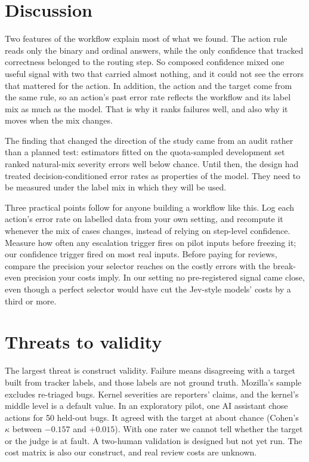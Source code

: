 \section{Discussion}
\label{sec:discussion}

Two features of the workflow explain most of what we found. The action
rule reads only the binary and ordinal answers, while the only confidence
that tracked correctness belonged to the routing step. So composed confidence mixed one useful signal with two that carried
almost nothing, and it could not see the errors that mattered for the
action. In addition, the action and the target come from the same rule,
so an action's past error rate reflects the workflow and its label mix
as much as the model. That is why it ranks failures well, and also why
it moves when the mix changes.

The finding that changed the direction of the study came from an audit
rather than a planned test: estimators fitted on the quota-sampled
development set ranked natural-mix severity errors well below chance.
Until then, the design had treated decision-conditioned error rates as
properties of the model. They need to be measured under the label mix in
which they will be used.

Three practical points follow for anyone building a workflow like this.
Log each action's error rate on labelled data from your own setting, and
recompute it whenever the mix of cases changes, instead of relying on
step-level confidence. Measure how often any escalation trigger fires on
pilot inputs before freezing it; our confidence trigger fired on most
real inputs. Before paying for reviews, compare the precision your
selector reaches on the costly errors with the break-even precision your
costs imply. In our setting no pre-registered signal came close, even
though a perfect selector would have cut the Jev-style models' costs by
a third or more.

\section{Threats to validity}
\label{sec:threats}

The largest threat is construct validity. Failure means disagreeing with
a target built from tracker labels, and those labels are not ground truth. Mozilla's sample excludes
re-triaged bugs. Kernel severities are reporters' claims, and the
kernel's middle level is a default value. In an exploratory pilot, one AI assistant chose actions for 50 held-out bugs.
It agreed with the target at about chance (Cohen's
$\kappa$ between $-0.157$ and $+0.015$). With one rater we cannot tell
whether the target or the judge is at fault. A two-human validation is
designed but not yet run. The cost matrix is also our construct, and real
review costs are unknown.

